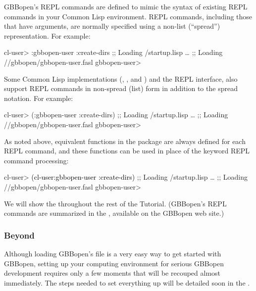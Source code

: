 \documentclass[10pt,twoside,english,pdftex]{article}
\begin{document}
GBBopen's REPL commands are defined to mimic the syntax of existing REPL
commands in your Common Lisp environment.  REPL commands, including those that
have arguments, are normally specified using a non-list (``spread'')
representation. For example:
%
\W\supp
\begin{example}
  cl-user> :gbbopen-user :create-dirs
  ;; Loading /startup.lisp
     \textrm{\ldots{}}
  ;; Loading //gbbopen/gbbopen-user.fasl
  gbbopen-user>
\end{example}
%
Some Common Lisp implementations (,
, and
) and the
 REPL interface, also
support REPL commands in non-spread (list) form in addition to the
spread notation.  For example:
%
\W\supp\notpretop
\begin{example}
  cl-user> (:gbbopen-user :create-dirs)
  ;; Loading /startup.lisp
     \textrm{\ldots{}}
  ;; Loading //gbbopen/gbbopen-user.fasl
  gbbopen-user>
\end{example}

As noted above, equivalent functions in the 
package are always defined for each REPL command, and these functions can be
used in place of the keyword REPL command processing:
%
\W\supp
\begin{example}
\textcolor{darkergray}{%
  cl-user> \textcolor{black}{(cl-user:gbbopen-user :create-dirs)}
  ;; Loading /startup.lisp
     \textrm{\ldots{}}
  ;; Loading //gbbopen/gbbopen-user.fasl
  gbbopen-user>}
\end{example}

We will show the 
throughout the rest of the Tutorial.  (GBBopen's REPL commands are summarized
in the , available on the
GBBopen web site.)

\subsubsection*{Beyond }

Although loading GBBopen's 
file is a very easy way to get started with GBBopen, setting up your computing
environment for serious GBBopen development requires only a few moments that
will be recouped almost immediately.  The steps needed to set everything up
will be detailed soon in the .
\end{document}
